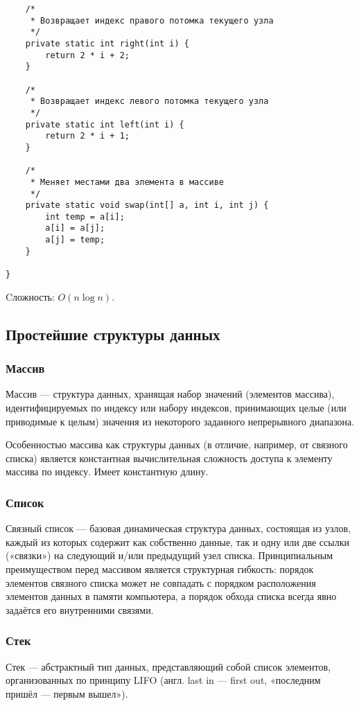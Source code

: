 \documentclass[12pt]{matmex-diploma}
\begin{document}
\begin{verbatim}
    /*
     * Возвращает индекс правого потомка текущего узла
     */
    private static int right(int i) {
        return 2 * i + 2;
    }
    
    /*
     * Возвращает индекс левого потомка текущего узла
     */
    private static int left(int i) {
        return 2 * i + 1;
    }
    
    /*
     * Меняет местами два элемента в массиве
     */
    private static void swap(int[] a, int i, int j) {
        int temp = a[i];
        a[i] = a[j];
        a[j] = temp;
    }

}
            \end{verbatim}
            
            Cложность: $O(n \log n)$.
            
    \subsection{Простейшие структуры данных}
    
        \subsubsection*{Массив}
            Массив — структура данных, хранящая набор значений (элементов массива), идентифицируемых по индексу или набору индексов, принимающих целые (или приводимые к целым) значения из некоторого заданного непрерывного диапазона. 
            
            Особенностью массива как структуры данных (в отличие, например, от связного списка) является константная вычислительная сложность доступа к элементу массива по индексу. Имеет константную длину.
            
        \subsubsection*{Список}
            Связный список — базовая динамическая структура данных, состоящая из узлов, каждый из которых содержит как собственно данные, так и одну или две ссылки («связки») на следующий и/или предыдущий узел списка. Принципиальным преимуществом перед массивом является структурная гибкость: порядок элементов связного списка может не совпадать с порядком расположения элементов данных в памяти компьютера, а порядок обхода списка всегда явно задаётся его внутренними связями.
            
        \subsubsection*{Стек}
            Стек — абстрактный тип данных, представляющий собой список элементов, организованных по принципу LIFO (англ. last in — first out, «последним пришёл — первым вышел»).
\end{document}
